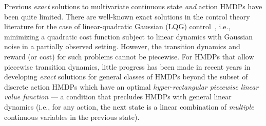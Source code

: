 \documentclass[twoside,11pt]{article}
\newcommand{\MarsRover}{\textsc{Mars Rover }}
\newcommand{\InventoryControl}{\textsc{Inventory Control }}
\newcommand{\WaterReservoir}{\textsc{Reservoir Management }}
\begin{document}



Previous \emph{exact} solutions to multivariate continuous
state \emph{and} action HMDPs have been quite limited.  There are
well-known exact solutions in the control theory literature for the
case of linear-quadratic Gaussian (LQG) control~\cite{lqgc}, i.e.,
minimizing a quadratic cost function subject to linear dynamics with
Gaussian noise in a partially observed setting.  However, the
transition dynamics and reward (or cost) for such problems cannot be
piecewise.  For HMDPs that allow piecewise transition dynamics, little
progress has been made in recent years in developing \emph{exact}
solutions for general classes of HMDPs beyond the subset of discrete
action HMDPs which have an optimal \emph{hyper-rectangular piecewise
  linear value function} \cite{feng04} --- a condition that precludes
HMDPs with general linear dynamics (i.e., for any action, the next
state is a linear combination of \emph{multiple} continuous variables
in the previous state).
\end{document}
